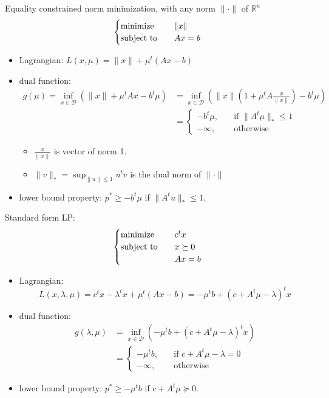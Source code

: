 \begin{remark}
    Equality constrained norm minimization, with any norm $\|\cdot\|$ of $\mathbb{R}^n$\[\begin{cases}
        \operatorname{minimize} \quad &\|x\|\\
        \operatorname{subject\ to} \quad &Ax = b
    \end{cases}\]
    \begin{itemize}
        \item Lagrangian: $L(x, \mu) = \|x\| + \mu^t(Ax - b)$
        \item dual function: 
            \begin{align*}
                g(\mu) = \inf_{x \in \mathcal{D}}\left(\|x\| + \mu^tAx - b^t\mu\right) &= \inf_{x \in \mathcal{D}}\left(\|x\|(1 + \mu^tA\frac{x}{\|x\|}) - b^t\mu\right)\\ 
                &=\begin{cases}
                    -b^t\mu, \quad&\text{if }\|A^t\mu\|_* \le 1\\
                    -\infty, \quad&\text{otherwise}
                \end{cases}
            \end{align*}
        \begin{itemize}
            \item $\frac{x}{\|x\|}$ is vector of norm 1.
            \item $\|v\|_* = \sup_{\|u\| \le 1}u^tv$ is the dual norm of $\|\cdot\|$
        \end{itemize}
        \item lower bound property: $p^* \ge -b^t\mu$ if $\|A^tu\|_* \le 1$.
    \end{itemize}
\end{remark}

\begin{remark}
    Standard form LP: \[\begin{cases}
        \operatorname{minimize} \quad & c^tx\\
        \operatorname{subject\ to} \quad & x \succeq 0\\
        & Ax = b
    \end{cases}\]
    \begin{itemize}
        \item Lagrangian: \[L(x, \lambda, \mu) = c^tx - \lambda^t x + \mu^t(Ax - b) = -\mu^tb + (c + A^t\mu - \lambda)^tx\]
        \item dual function: \begin{align*}
            g(\lambda, \mu) &= \inf_{x \in \mathcal{D}} \left(-\mu^tb + (c + A^t\mu - \lambda)^tx\right)\\
            &= \begin{cases}
                -\mu^tb, \quad &\text{if } c + A^t\mu - \lambda = 0\\
                -\infty, \quad &\text{otherwise}
            \end{cases}
        \end{align*}
        \item lower bound property: $p^* \ge -\mu^tb$ if $c + A^t\mu \succeq 0$.
    \end{itemize}
\end{remark}

